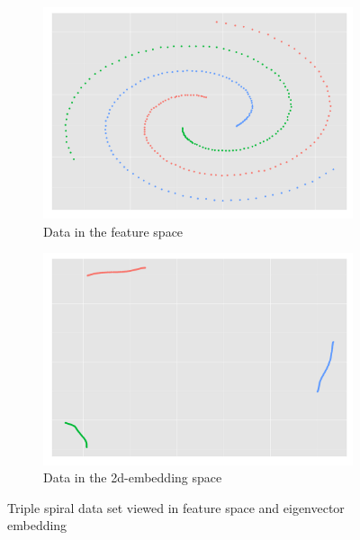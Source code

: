 \begin{figure}[h!]
  \centering
  \begin{subfigure}{0.4\textwidth}
    \centering
    \includegraphics[width = \textwidth, height = \textwidth]{code_embedding/3_spiral_original.png}
    \caption{Data in the feature space}
  \label{fig:spirals_original}
  \end{subfigure}
  \begin{subfigure}{0.4\textwidth}
    \centering
    \includegraphics[width =\textwidth, height = \textwidth]{code_embedding/3_spiral_embedded.png}
     \caption{Data in the 2d-embedding space}
     \label{fig:spirals_embedded}
     \end{subfigure}
  \caption{Triple spiral data set viewed in feature space and eigenvector embedding}
  \label{fig:triple_spirals}
\end{figure}


